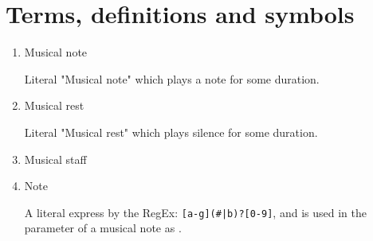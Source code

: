 \section{Terms, definitions and symbols}

\begin{enumerate}
\item Musical note

Literal "Musical note" which plays a note for some duration.

\item Musical rest

Literal "Musical rest" which plays silence for some duration.

\item Musical staff

\item Note

A literal express by the RegEx: \verb+[a-g](#|b)?[0-9]+, and is used
in the parameter of a musical note as .
\end{enumerate}
